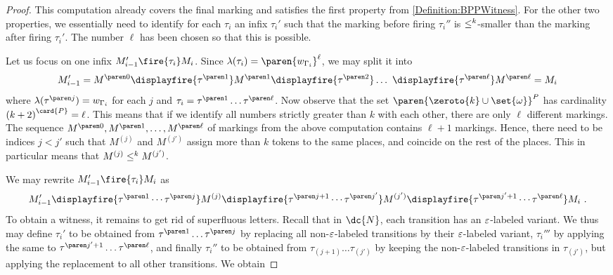 \documentclass[../../diss.tex]{subfiles}
\begin{document}
\begin{proof}
    This computation already covers the final marking and satisfies the first property from \cref{Definition:BPPWitness}.
    For the other two properties, we essentially need to identify for each $\tau_i$ an infix $\tau_i'$ such that the marking before firing $\tau_i''$ is $\leq^k$-smaller than the marking after firing $\tau_i'$.
    The number $\ell$ has been chosen so that this is possible.

    Let us focus on one infix $M_{i-1}' \fire{\tau_{i}} M_i$.
    Since $\lambda(\tau_i) = \paren{w_{\Gamma_i}}^{\ell}$, we may split it into
    \[
        M_{i-1}'
        = \itr{M}{0}
        \displayfire{ \itr{\tau}{1} }
        \itr{M}{1}
        \displayfire{ \itr{\tau}{2} }
        \ldots \
        \displayfire{ \itr{\tau}{\ell} }
        \itr{M}{\ell}
        = M_i
    \]
    where $\lambda( \itr{\tau}{j} ) = w_{\Gamma_i}$ for each $j$ and $\tau_i = \itr{\tau}{1} \ldots \itr{\tau}{\ell}$.
    Now observe that the set $\paren{\zeroto{k} \cup \set{\omega}}^{P}$ has cardinality ${(k+2)}^{\card{P}}=\ell$.
    This means that if we identify all numbers strictly greater than $k$ with each other, there are only $\ell$ different markings.
    The sequence $\itr{M}{0}, \itr{M}{1}, \ldots, \itr{M}{\ell}$ of markings from the above computation contains $\ell+1$ markings.
    Hence, there need to be indices $j < j'$ such that $M^{(j)}$ and $M^{(j')}$ assign more than $k$ tokens to the same places, and coincide on the rest of the places.
    This in particular means that $M^{(j)} \leq^k M^{(j')}$.

    We may rewrite $M_{i-1}' \fire{\tau_{i}} M_i$ as
    \[
        M_{i-1}'
        \displayfire{ \itr{\tau}{1} \cdots \itr{\tau}{j} }
        M^{(j)}
        \displayfire{ \itr{\tau}{j+1} \cdots \itr{\tau}{j'} }
        M^{(j')}
        \displayfire{ \itr{\tau}{j'+1} \cdots \itr{\tau}{\ell} }
        M_i
        \ .
    \]
    To obtain a witness, it remains to get rid of superfluous letters.
    Recall that in $\dc{N}$, each transition has an $\varepsilon$-labeled variant.
    We thus may define $\tau_i'$ to be obtained from $\itr{\tau}{1} \ldots \itr{\tau}{j}$ by replacing all non-$\varepsilon$-labeled transitions by their $\varepsilon$-labeled variant, $\tau_i'''$ by applying the same to $\itr{\tau}{j'+1} \ldots \itr{\tau}{\ell}$, and finally $\tau_i''$ to be obtained from $\tau_{(j+1)} \ldots \tau_{(j')}$ by keeping the non-$\varepsilon$-labeled transitions in $\tau_{(j')}$, but applying the replacement to all other transitions.
    We obtain \nb{$\lambda(\tau_i') = \lambda(\tau_i''') = \eps$, $\lambda(\tau_i'') = w_{\Gamma_i}$.}


\end{proof}
\end{document}
